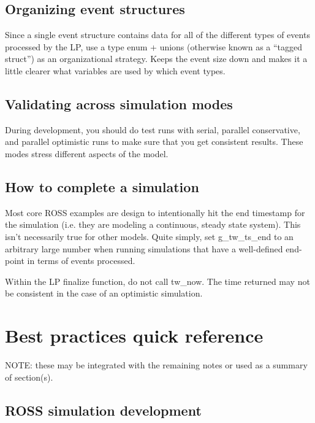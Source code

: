 \documentclass[conference,10pt,compsocconf,onecolumn]{IEEEtran}
\begin{document}
\subsection{Organizing event structures}

Since a single event structure contains data for all of the different types of
events processed by the LP, use a type enum + unions (otherwise known as a
``tagged struct'') as an organizational strategy. Keeps the event size down and
makes it a little clearer what variables are used by which event types.

\subsection{Validating across simulation modes}

During development, you should do test runs with serial, parallel conservative,
and parallel optimistic runs to make sure that you get consistent results.
These modes stress different aspects of the model.

\subsection{How to complete a simulation}

Most core ROSS examples are design to intentionally hit
the end timestamp for the simulation (i.e. they are modeling a continuous,
steady state system). This isn't necessarily true for other models. Quite
simply, set g\_tw\_ts\_end to an arbitrary large number when running simulations
that have a well-defined end-point in terms of events processed.

Within the LP finalize function, do not call tw\_now. The time returned may not
be consistent in the case of an optimistic simulation.

\section{Best practices quick reference}

NOTE: these may be integrated with the remaining notes or used as a summary of
section(s).

\subsection{ROSS simulation development}
\end{document}
